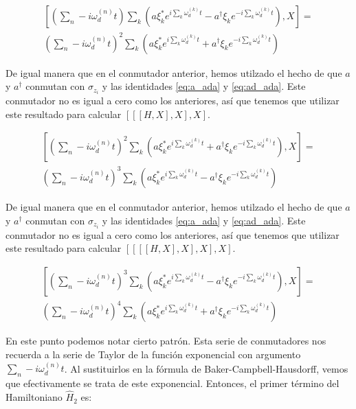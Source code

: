 \begin{multline}
    \left[\left(\sum\limits_n-i \omega_d^{(n)} t\right) \sum\limits_k \left(a\xi_k^*e^{i\sum\limits_k \omega_d^{(k)}t} - a^\dagger\xi_ke^{-i\sum\limits_k \omega_d^{(k)}t}\right), X\right] = \\
    \left(\sum\limits_n-i \omega_d^{(n)} t\right)^2 \sum\limits_k \left(a\xi_k^*e^{i\sum\limits_k \omega_d^{(k)}t} + a^\dagger\xi_ke^{-i\sum\limits_k \omega_d^{(k)}t}\right)
\end{multline}
 
De igual manera que en el conmutador anterior, hemos utilzado el hecho de que $a$ y $a^\dagger$ conmutan con $\sigma_{z_i}$ y las identidades \ref{eq:a_ada} y \ref{eq:ad_ada}. Este conmutador no es igual a cero como los anteriores, así que tenemos que utilizar este resultado para calcular $[[[H,X],X],X]$.

\begin{multline}
    \left[\left(\sum\limits_n-i \omega_d^{(n)} t\right)^2 \sum\limits_k \left(a\xi_k^*e^{i\sum\limits_k \omega_d^{(k)}t}+ a^\dagger\xi_ke^{-i\sum\limits_k \omega_d^{(k)}t}\right), X\right] = \\
    \left(\sum\limits_n-i \omega_d^{(n)} t\right)^3 \sum\limits_k \left(a\xi_k^*e^{i\sum\limits_k \omega_d^{(k)}t} - a^\dagger\xi_ke^{-i\sum\limits_k \omega_d^{(k)}t}\right)
\end{multline}

De igual manera que en el conmutador anterior, hemos utilzado el hecho de que $a$ y $a^\dagger$ conmutan con $\sigma_{z_i}$ y las identidades \ref{eq:a_ada} y \ref{eq:ad_ada}. Este conmutador no es igual a cero como los anteriores, así que tenemos que utilizar este resultado para calcular $[[[[H,X],X],X],X]$.

\begin{multline}
    \left[\left(\sum\limits_n-i \omega_d^{(n)} t\right)^3 \sum\limits_k \left(a\xi_k^*e^{i\sum\limits_k \omega_d^{(k)}t} - a^\dagger\xi_ke^{-i\sum\limits_k \omega_d^{(k)}t}\right), X\right] = \\
    \left(\sum\limits_n-i \omega_d^{(n)} t\right)^4 \sum\limits_k \left(a\xi_k^*e^{i\sum\limits_k \omega_d^{(k)}t} + a^\dagger\xi_ke^{-i\sum\limits_k \omega_d^{(k)}t}\right)
\end{multline}

En este punto podemos notar cierto patrón. Esta serie de conmutadores nos recuerda a la serie de Taylor de la función exponencial con argumento $\sum\limits_n-i \omega_d^{(n)} t$. Al sustituirlos en la fórmula de Baker-Campbell-Hausdorff, vemos que efectivamente se trata de este exponencial. Entonces, el primer término del Hamiltoniano $\hat{H}_2$ es:

